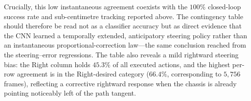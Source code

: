 Crucially, this low instantaneous agreement coexists with the $100\%$ closed-loop success rate and sub-centimetre tracking reported above. The contingency table should therefore be read not as a classifier accuracy but as direct evidence that the CNN learned a temporally extended, anticipatory steering policy rather than an instantaneous proportional-correction law---the same conclusion reached from the steering--error regressions. The table also reveals a mild rightward steering bias: the Right column holds $45.3\%$ of all executed actions, and the highest per-row agreement is in the Right-desired category ($66.4\%$, corresponding to $5{,}756$ frames), reflecting a corrective rightward response when the chassis is already pointing noticeably left of the path tangent.
